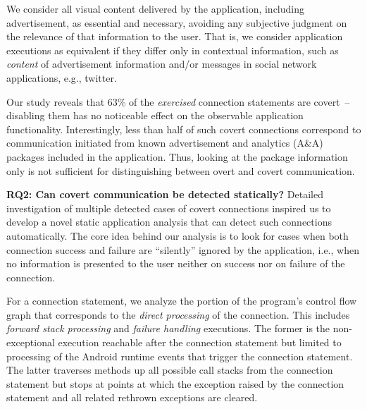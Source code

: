 We consider all visual content delivered by the application, including advertisement, as essential and necessary, avoiding any subjective judgment on the relevance of that information to the user.  
That is, we consider application executions as
equivalent if they %
differ only in contextual information, such as   
\emph{content} of advertisement information and/or messages in social network
applications, e.g., twitter.

Our study reveals that 63\% of
the \emph{exercised} connection statements are covert~-- disabling
them has no noticeable effect on the observable application
functionality. Interestingly, less than half of such covert connections correspond to communication initiated from known advertisement and analytics (A\&A) packages included in the application.
Thus, looking at the package information only is not sufficient for distinguishing between
overt and covert communication. 

\noindent 
{\bf RQ2: Can covert communication be detected statically?}
Detailed investigation of multiple detected cases of covert
connections inspired us to develop a novel static application analysis that
can detect such connections automatically.  The core idea behind our
analysis is to look for cases when both connection success and failure are ``silently'' ignored by the application, i.e., when no information is presented to the user neither on success nor on   failure of the connection. 

For a connection statement, we analyze the portion of the program's
control flow graph that corresponds to the \emph{direct processing} of
the connection.  This includes
\emph{forward stack processing} and \emph{failure handling}
executions.  The former is the non-exceptional execution reachable
after the connection statement but limited to processing of the
Android runtime events that trigger the connection statement.
The latter traverses methods up all possible call stacks from the
connection statement but stops at points at which the
exception raised by the connection statement and all related rethrown
exceptions are cleared.

